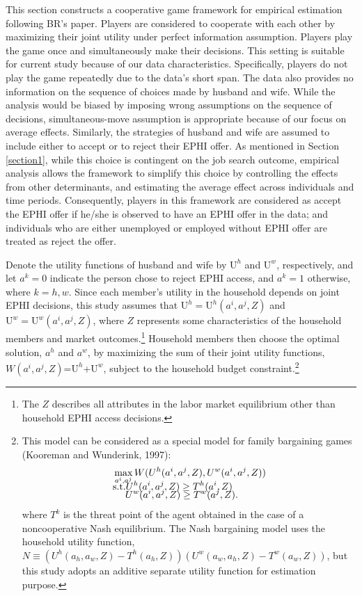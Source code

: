 \documentclass[legno,11pt]{article}
\begin{document}
This section constructs a cooperative game framework for empirical
estimation following BR's paper. Players are considered to cooperate
with each other by maximizing their joint utility under perfect
information assumption. Players play the game once and
simultaneously make their decisions. This setting is suitable for
current study because of our data characteristics. Specifically,
players do not play the game repeatedly due to the data's short
span. The data also provides no information on the sequence of
choices made by husband and wife. While the analysis would be biased
by imposing wrong assumptions on the sequence of decisions,
simultaneous-move assumption is appropriate because of our focus on
average effects. Similarly, the strategies of husband and wife are
assumed to include either to accept or to reject their EPHI offer.
As mentioned in Section \ref{section1}, while this choice is
contingent on the job search outcome, empirical analysis allows the
framework to simplify this choice by controlling the effects from
other determinants, and estimating the average effect across
individuals and time periods. Consequently, players in this
framework are considered as accept the EPHI offer if he/she is
observed to have an EPHI offer in the data; and individuals who are
either unemployed or employed without EPHI offer are treated as
reject the offer.
\par
Denote the utility functions of husband and wife by $\text{U}^{h}$
and $\text{U}^{w}$, respectively, and let $a^{k}=0$ indicate the
person chose to reject EPHI access, and $a^{k}=1$ otherwise, where
$k=h,w$. Since each member's utility in the household depends on
joint EPHI decisions, this study assumes that
$\text{U}^{h}=\text{U}^{h}(a^{i},a^{j},Z)$ and
$\text{U}^{w}=\text{U}^{w}(a^{i},a^{j},Z)$, where $Z$ represents
some characteristics of the household members and market
outcomes.\footnote{The $Z$ describes all attributes in the labor
market equilibrium other than household EPHI access decisions.}
Household members then choose the optimal solution, $a^{h}$ and
$a^{w}$, by maximizing the sum of their joint utility functions,
$W(a^{i},a^{j},Z)$=$\text{U}^{h}$+$\text{U}^{w}$, subject to the
household budget constraint.\footnote{This model can be considered
as a special model for family bargaining games (Kooreman and
Wunderink, 1997):
\begin{align}
&\max\limits_{a^{i},a^{j}} W(U^{h}(a^{i},a^{j},Z),U^{w}(a^{i},a^{j},Z))\label{family_utility}\\[-8pt]
&\text{s.t.}U^{h}(a^{i},a^{j},Z)\geq T^{h}(a^{i},Z)\notag\\[-8pt]
&\hspace{1mm}\quad U^{w}(a^{i},a^{j},Z)\geq T^{w}(a^{j},Z).\notag
\end{align}
where $T^{k}$ is the threat point of the agent obtained in the case
of a noncooperative Nash equilibrium. The Nash bargaining model uses
the household utility function, $N \equiv (U^{h}(a_{h},a_{w},Z)-
T^{h}(a_{h},Z))(U^{w}(a_{w},a_{h},Z)-T^{w}(a_{w},Z))$, but this
study adopts an additive separate utility function for estimation purpose.}
\end{document}
